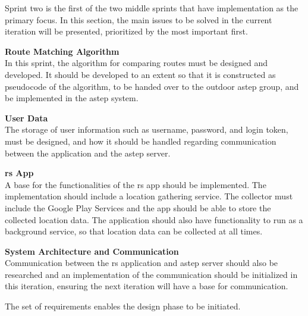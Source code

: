 Sprint two is the first of the two middle sprints that have implementation as the primary focus. In this section, the main issues to be solved in the current iteration will be presented, prioritized by the most important first.

\textbf{Route Matching Algorithm}\\
In this sprint, the algorithm for comparing routes must be designed and developed. 
It should be developed to an extent so that it is constructed as pseudocode of the algorithm, to be handed over to the outdoor \gls{astep} group, and be implemented in the \gls{astep} system.

\textbf{User Data}\\
The storage of user information such as username, password, and login token, must be designed, and how it should be handled regarding communication between the application and the \gls{astep} server.

\textbf{\gls{rs} App}\\
A base for the functionalities of the \gls{rs} app should be implemented. 
The implementation should include a location gathering service.
The collector must include the Google Play Services and the app should be able to store the collected location data. 
The application should also have functionality to run as a background service, so that location data can be collected at all times.

\textbf{System Architecture and Communication}\\
Communication between the \gls{rs} application and \gls{astep} server should also be researched and an implementation of the communication should be initialized in this iteration, ensuring the next iteration will have a base for communication. 


The set of requirements enables the design phase to be initiated.